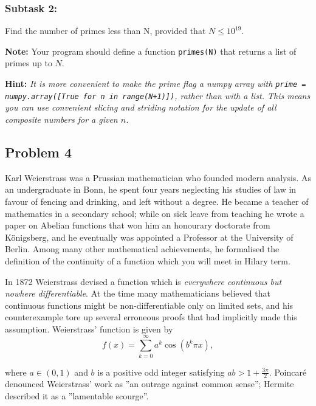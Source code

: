 \documentclass[12pt]{article}
\begin{document}
\subsubsection*{\textbf{Subtask 2:}} 
Find the number of primes less than N, provided that $N \leq 10^{19}$.

\vspace{1em}
\textbf{Note: }Your program should define a function \texttt{primes(N)} that returns a list of primes up to $N$.


\vspace{1em}

\noindent \textbf{Hint:}\textit{ It is more convenient to make the prime flag a numpy array with \texttt{prime = numpy.array([True for n in range(N+1)])}, rather than with a list. This means you can use convenient slicing and striding notation for the update of all composite numbers for a given $n$.}


\newpage
\subsection{Problem 4}
Karl Weierstrass was a Prussian mathematician who founded modern analysis. As an undergraduate in Bonn, he spent four years neglecting his studies of law in favour of fencing and drinking, and left without a degree. He became a teacher of mathematics in a secondary school; while on sick leave from teaching he wrote a paper on Abelian functions that won him an honourary doctorate from K\"onigsberg, and he eventually was appointed a Professor at the University of Berlin. Among many other mathematical achievements, he formalised the definition of the continuity of a function which you will meet in Hilary term.
            
            \vspace{1em}
            
In 1872 Weierstrass devised a function which is \textit{everywhere continuous but nowhere differentiable}. At the time many mathematicians believed that continuous functions might be non-differentiable only on limited sets, and his counterexample tore up several erroneous proofs that had implicitly made this assumption. Weierstrass' function is given by
$$ f(x) = \sum_{k=0}^{\infty} a^k \cos \left( b^k \pi x \right),$$

\vspace{1em}

where $a \in (0, 1)$ and $b$ is a positive odd integer satisfying $ab > 1 + \frac{3\pi}{2}$. Poincar\'e denounced Weierstrass' work as ''an outrage against common sense''; Hermite described it as a ''lamentable scourge''.
\end{document}
